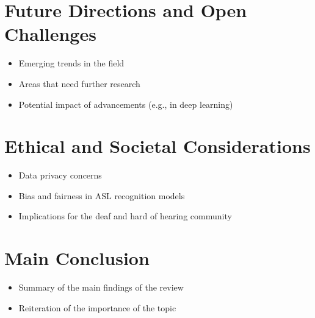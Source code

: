 \section{Future Directions and Open Challenges}
\begin{itemize}
    \item Emerging trends in the field
    \item Areas that need further research
    \item Potential impact of advancements (e.g., in deep learning)
\end{itemize}

\section{Ethical and Societal Considerations}
\begin{itemize}
    \item Data privacy concerns
    \item Bias and fairness in ASL recognition models
    \item Implications for the deaf and hard of hearing community

\end{itemize}

\section{Main Conclusion}
\begin{itemize}
    \item Summary of the main findings of the review
    \item Reiteration of the importance of the topic
\end{itemize}